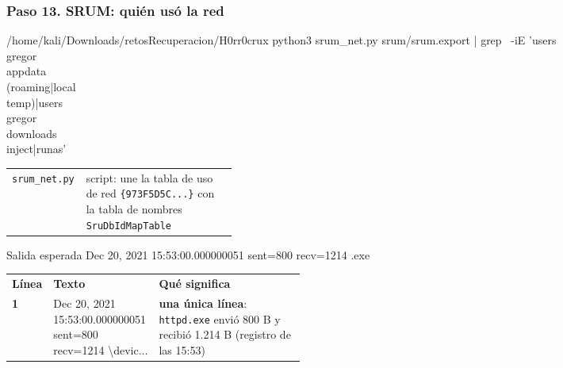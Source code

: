 \documentclass[11pt,a4paper]{article}
\begin{document}
\subsubsection*{Paso 13. SRUM: quién usó la red}
\begin{comando}{/home/kali/Downloads/retosRecuperacion/H0rr0crux}
python3 srum_net.py srum/srum.export | grep \
  -iE 'users\\gregor\\appdata\\(roaming|local\\temp)|users\\gregor\\downloads\\inject|runas'
\end{comando}
\begin{tcolorbox}[enhanced, breakable, colback=white, colframe=gray!40, boxrule=0.3pt, arc=1pt, left=4pt, right=4pt, top=2pt, bottom=2pt, fonttitle=\sffamily\scriptsize\bfseries, coltitle=black!75, colbacktitle=gray!8, title={Qué hace cada parte}, attach title to upper, before skip=2pt, after skip=4pt, fontupper=\small]
\par{\renewcommand{\arraystretch}{1.12}\begin{tabularx}{\linewidth}{@{}>{\raggedright\arraybackslash}p{0.33\linewidth}>{\raggedright\arraybackslash}X@{}}
\texttt{srum\_\allowbreak{}net.py} & script: une la tabla de uso de red \texttt{\{973F5D5C...\}} con la tabla de nombres \texttt{SruDbIdMapTable} \\
\end{tabularx}}
\end{tcolorbox}
\begin{salidan}{Salida esperada}
Dec 20, 2021 15:53:00.000000051 sent=800        recv=1214       \device{}\users\gregor\appdata\roaming\microsoft\windows\httpd.exe
\end{salidan}
\begin{tcolorbox}[enhanced, breakable, colback=white, colframe=blue!40, boxrule=0.3pt, arc=1pt, left=4pt, right=4pt, top=2pt, bottom=2pt, fonttitle=\sffamily\scriptsize\bfseries, coltitle=black!75, colbacktitle=blue!8, title={Análisis de la salida}, attach title to upper, before skip=2pt, after skip=4pt, fontupper=\small]
\par{\renewcommand{\arraystretch}{1.12}\begin{tabularx}{\linewidth}{@{}>{\raggedright\arraybackslash}p{0.07\linewidth}>{\raggedright\arraybackslash}p{0.36\linewidth}>{\raggedright\arraybackslash}X@{}}
\textbf{Línea} & \textbf{Texto} & \textbf{Qué significa} \\
\textbf{1} & {\ttfamily\scriptsize Dec 20, 2021\allowbreak{} 15:53:00.00\allowbreak{}0000051 sent\allowbreak{}=800        \allowbreak{}recv=1214   \allowbreak{}    \textbackslash{}devic..\allowbreak{}.} & \textbf{una única línea}: \texttt{httpd.exe} envió 800 B y recibió 1.214 B (registro de las 15:53) \\
\end{tabularx}}
\end{tcolorbox}
\end{document}
